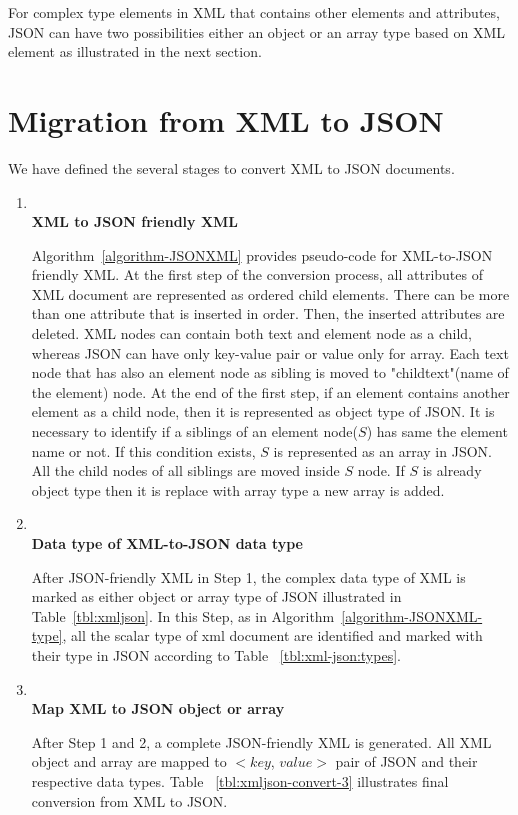 For complex type elements in XML that contains other elements and attributes, JSON can have two possibilities either an object or an array type based on XML element as illustrated in the next section.

\section{Migration from XML to JSON}\label{xml-to-json-migration}
We have defined the several stages to convert XML to JSON documents.
\begin{enumerate}[label=\textbf{Step \arabic *.}]
	\item~\\
	\textbf{XML to JSON friendly XML}
	\par
	Algorithm~\ref{algorithm-JSONXML} provides pseudo-code for XML-to-JSON friendly XML. At the first step of the conversion process, all attributes of XML document are represented as ordered child elements. There can be more than one attribute that is inserted in order. Then, the inserted attributes are deleted.  XML nodes can contain both text and element node as a child, whereas JSON can have only key-value pair or value only for array. Each text node that  has also an element node as sibling is moved to "childtext"(name of the element) node. At the end of the first step, if an element contains another element as a child node, then it is represented as object type of JSON. It is necessary to identify if a siblings of an element node($S$) has same the element name or not. If this condition exists, $S$ is represented as an array in JSON. All the child nodes of all siblings are moved inside $S$ node. If $S$ is already  object type  then it is replace with array type  a new array is added. %
	
	\item~\\
	\textbf{Data type of XML-to-JSON data type}
	\par
	After JSON-friendly XML in Step 1, the complex data type of XML is marked as either object or array type of JSON illustrated in Table~\ref{tbl:xmljson}. In this Step,  as in 
	Algorithm~\ref{algorithm-JSONXML-type}, all the scalar type of xml document are identified and marked with their type in JSON according to Table ~\ref{tbl:xml-json:types}.
	\item~\\
	\textbf{Map XML to JSON object or array}
	\par
	After Step 1 and 2, a complete JSON-friendly XML is generated. All XML object and array are mapped to $<$$key$, $value$$>$ pair of JSON and their respective data types. Table ~\ref{tbl:xmljson-convert-3} illustrates final conversion from XML to JSON.
\end{enumerate}

